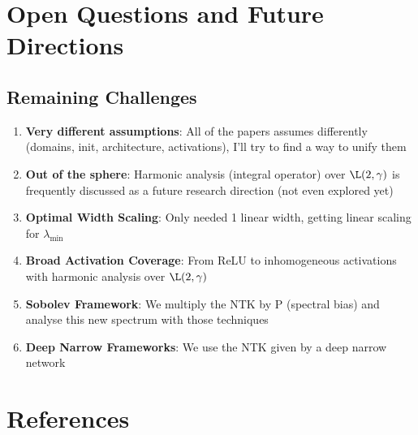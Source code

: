 \documentclass{article}
\newcommand{\lambdaMin}{\lambda_{\min}}
\begin{document}
\newpage



\section{Open Questions and Future Directions}

\subsection{Remaining Challenges}
\begin{enumerate}
    \item \textbf{Very different assumptions}: All of the papers assumes differently (domains, init, architecture, activations), I'll try to find a way to unify them
    \item \textbf{Out of the sphere}: Harmonic analysis (integral operator) over $\L(2,\gamma)$ is frequently discussed as a future research direction (not even explored yet)
    \item \textbf{Optimal Width Scaling}: Only needed 1 linear width, getting linear scaling for $\lambdaMin$
    \item \textbf{Broad Activation Coverage}: From ReLU to inhomogeneous activations with harmonic analysis over $\L(2,\gamma)$
    \item \textbf{Sobolev Framework}: We multiply the NTK by P (spectral bias) and analyse this new spectrum with those techniques
    \item \textbf{Deep Narrow Frameworks}: We use the NTK given by a deep narrow network
\end{enumerate}

\newpage

\section*{References}
\end{document}
